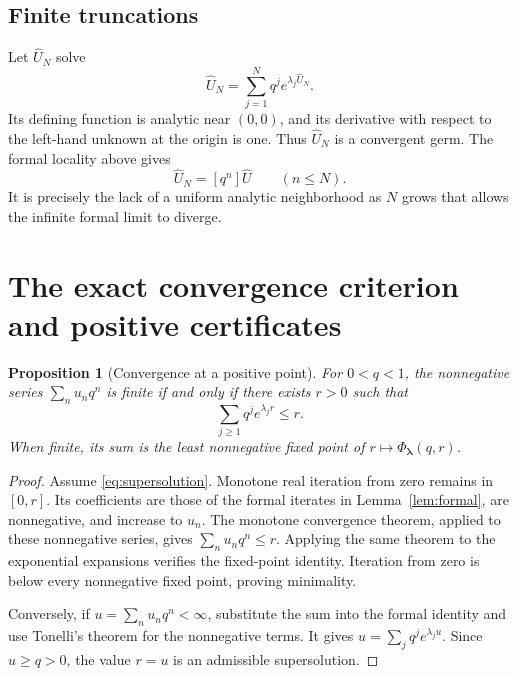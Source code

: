 \documentclass[11pt,a4paper]{article}
\numberwithin{equation}{section}
\newtheorem{proposition}[theorem]{Proposition}
\theoremstyle{definition}
\theoremstyle{remark}
\newcommand{\lam}{\boldsymbol\lambda}
\newcommand{\PhiL}{\Phi_{\lam}}
\newcommand{\Uhat}{\widehat U}
\begin{document}
\subsection{Finite truncations}
Let $\Uhat_N$ solve
\begin{equation}
 \Uhat_N=\sum_{j=1}^Nq^j e^{\lambda_j\Uhat_N}.
 \label{eq:finitekernel}
\end{equation}
Its defining function is analytic near $(0,0)$, and its derivative with
respect to the left-hand unknown at the origin is one.  Thus $\Uhat_N$
is a convergent germ.  The formal locality above gives
\begin{equation}
 [q^n]\Uhat_N=[q^n]\Uhat\qquad(n\le N).
 \label{eq:finiteagreement}
\end{equation}
It is precisely the lack of a uniform analytic neighborhood as $N$ grows
that allows the infinite formal limit to diverge.

\section{The exact convergence criterion and positive certificates}
\label{sec:convergence}

\begin{proposition}[Convergence at a positive point]
\label{prop:majorant}
For $0<q<1$, the nonnegative series $\sum_nu_nq^n$ is finite if and only if
there exists $r>0$ such that
\begin{equation}
 \sum_{j\ge1}q^j e^{\lambda_jr}\le r.
 \label{eq:supersolution}
\end{equation}
When finite, its sum is the least nonnegative fixed point of
$r\mapsto\PhiL(q,r)$.
\end{proposition}

\begin{proof}
Assume \eqref{eq:supersolution}.  Monotone real iteration from zero remains
in $[0,r]$.  Its coefficients are those of the formal iterates in
Lemma~\ref{lem:formal}, are nonnegative, and increase to $u_n$.
The monotone convergence theorem, applied to these nonnegative series,
gives $\sum_nu_nq^n\le r$.  Applying the same theorem to the exponential
expansions verifies the fixed-point identity.  Iteration from zero is
below every nonnegative fixed point, proving minimality.

Conversely, if $u=\sum_nu_nq^n<\infty$, substitute the sum into the formal
identity and use Tonelli's theorem for the nonnegative terms.  It gives
$u=\sum_jq^je^{\lambda_ju}$.  Since $u\ge q>0$, the value $r=u$ is an
admissible supersolution.
\end{proof}
\end{document}
